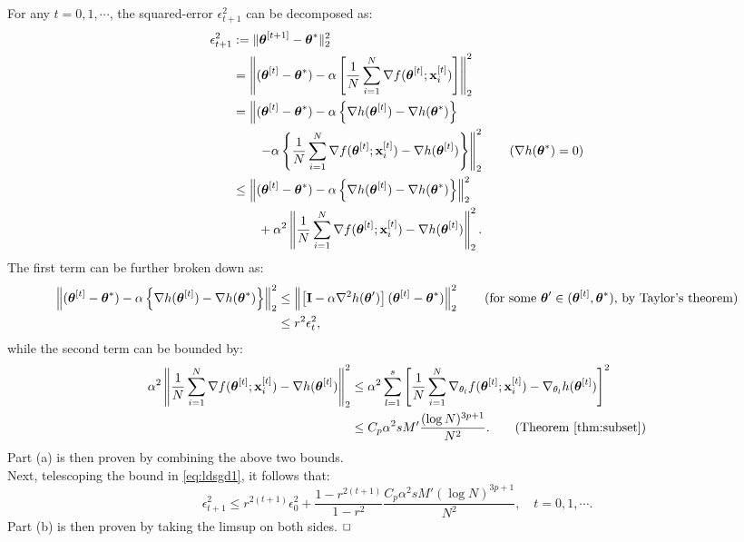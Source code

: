 \documentclass[12pt]{article}
\newcommand{\bm}[1]{\mathbf{#1}}
\newenvironment{proof}{\begin{trivlist}
    \item[\hskip\labelsep{\it Proof.}]}{$\hfill\Box$\end{trivlist}}
\begin{document}
\begin{proof}
For any $t = 0, 1, \cdots$, the squared-error $\epsilon_{t+1}^2$ can be decomposed as:
\begin{align}
\epsilon_{t+1}^2 &:= \|\boldsymbol{\theta}^{[t+1]} - \boldsymbol{\theta}^*\|_2^2 \notag \\
&= \left\| (\boldsymbol{\theta}^{[t]} - \boldsymbol{\theta}^*) - \alpha \left[ \frac{1}{N} \sum_{i=1}^N \nabla f(\boldsymbol{\theta}^{[t]}; \bm{x}_i^{[t]}) \right] \right\|_2^2 \notag \\
&= \left\| (\boldsymbol{\theta}^{[t]} - \boldsymbol{\theta}^*) - \alpha \left\{ \nabla h(\boldsymbol{\theta}^{[t]}) - \nabla h(\boldsymbol{\theta}^*) \right\} \right. \notag \\
& \quad \quad \left. - \alpha \left\{ \frac{1}{N} \sum_{i=1}^N \nabla f(\boldsymbol{\theta}^{[t]}; \bm{x}_i^{[t]}) - \nabla h(\boldsymbol{\theta}^{[t]}) \right\} \right\|_2^2 \tag{$\nabla h(\boldsymbol{\theta}^*) = 0$}\\
& \leq \left\| (\boldsymbol{\theta}^{[t]} - \boldsymbol{\theta}^*) - \alpha \left\{ \nabla h(\boldsymbol{\theta}^{[t]}) - \nabla h(\boldsymbol{\theta}^*) \right\} \right\|_2^2 \notag \\
& \quad \quad + \alpha^2 \left\| \frac{1}{N} \sum_{i=1}^N \nabla f(\boldsymbol{\theta}^{[t]}; \bm{x}_i^{[t]}) - \nabla h(\boldsymbol{\theta}^{[t]}) \right\|_2^2. \notag
\end{align}
The first term can be further broken down as:
\begin{align}
\left\| (\boldsymbol{\theta}^{[t]} - \boldsymbol{\theta}^*) - \alpha \left\{ \nabla h(\boldsymbol{\theta}^{[t]}) - \nabla h(\boldsymbol{\theta}^*) \right\} \right\|_2^2 & \leq \left\| \left[ \bm{I} - \alpha \nabla^2 h(\boldsymbol{\theta}') \right] (\boldsymbol{\theta}^{[t]} - \boldsymbol{\theta}^*) \right\|_2^2 \tag{for some $\boldsymbol{\theta}' \in (\boldsymbol{\theta}^{[t]}, \boldsymbol{\theta}^*)$, by Taylor's theorem}\\
& \leq r^2 \epsilon_t^2,
\end{align}
while the second term can be bounded by:
\begin{align}
\alpha^2 \left\| \frac{1}{N} \sum_{i=1}^N \nabla f(\boldsymbol{\theta}^{[t]}; \bm{x}_i^{[t]}) - \nabla h(\boldsymbol{\theta}^{[t]}) \right\|_2^2 & \leq \alpha^2 \sum_{l=1}^s \left[ \frac{1}{N} \sum_{i=1}^N \nabla_{\theta_l} f(\boldsymbol{\theta}^{[t]}; \bm{x}_i^{[t]}) - \nabla_{\theta_l} h(\boldsymbol{\theta}^{[t]}) \right]^2 \notag \\
& \leq C_p \alpha^2 s M' \frac{(\log N)^{3p+1}}{N^2}. \tag{Theorem \ref{thm:subset}}
\end{align}
Part (a) is then proven by combining the above two bounds.\\

Next, telescoping the bound in \eqref{eq:ldsgd1}, it follows that:
\[\epsilon^2_{t+1} \leq r^{2(t+1)} \epsilon^2_0 + \frac{1-r^{2(t+1)}}{1-r^2}\frac{C_p \alpha^2 s M' (\log N)^{3p+1}}{N^2}, \quad t = 0, 1, \cdots.\]
Part (b) is then proven by taking the limsup on both sides.
\end{proof}
\end{document}

